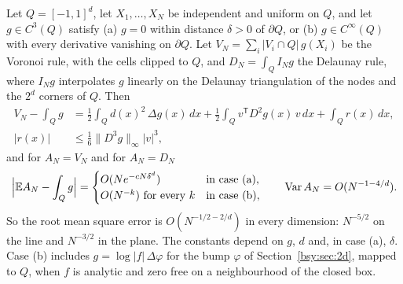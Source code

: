 \begin{theorem}\label{bsy:thm:wmc}
Let $Q=[-1,1]^d$, let $X_1,\dots,X_N$ be independent and uniform on $Q$, and let $g\in C^3(Q)$ satisfy (a) $g=0$ within distance $\delta>0$ of $\partial Q$, or (b) $g\in C^\infty(Q)$ with every derivative vanishing on $\partial Q$. Let $V_N=\sum_i|V_i\cap Q|\,g(X_i)$ be the Voronoi rule, with the cells clipped to $Q$, and $D_N=\int_QI_Ng$ the Delaunay rule, where $I_Ng$ interpolates $g$ linearly on the Delaunay triangulation of the nodes and the $2^d$ corners of $Q$. Then
\begin{align*}
V_N-\int_Qg&=\frac12\int_Qd(x)^2\,\Delta g(x)\,dx+\frac12\int_Qv^{\mathsf T}D^2g(x)\,v\,dx+\int_Qr(x)\,dx,\\
|r(x)|&\le\tfrac16\|D^3g\|_\infty|v|^3,
\end{align*}
and for $A_N=V_N$ and for $A_N=D_N$
\[
\Bigl|\mathbb{E} A_N-\int_Qg\Bigr|=\begin{cases}O(Ne^{-cN\delta^d})&\text{in case (a)},\\ O(N^{-k})\ \text{for every }k&\text{in case (b)},\end{cases}\qquad\mathrm{Var}\,A_N=O(N^{-1-4/d}).
\]
So the root mean square error is $O(N^{-1/2-2/d})$ in every dimension: $N^{-5/2}$ on the line and $N^{-3/2}$ in the plane. The constants depend on $g$, $d$ and, in case (a), $\delta$. Case (b) includes $g=\log|f|\,\Delta\varphi$ for the bump $\varphi$ of Section~\ref{bsy:sec:2d}, mapped to $Q$, when $f$ is analytic and zero free on a neighbourhood of the closed box.
\end{theorem}

